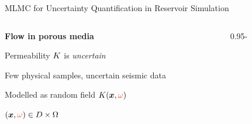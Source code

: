 \def\name{MLMC for Uncertainty Quantification in Reservoir Simulation}

\begin{frame}{\name{}}
    \setlength{\cw}{0.6\textwidth}%
    \begin{overlayarea}{\textwidth}{\frameheight}
        \vspace{2em}
        \begin{columns}
            \begin{column}{\cw}
                \textbf{Flow in porous media}
                \begin{squarelist}
                    \item<3-> Permeability $K$ is \emph{uncertain}
                    \begin{vertlist}
                        \item Few physical samples, uncertain seismic data
                    \end{vertlist}
                    \item<4-> Modelled as random field $K(\vx, \redtext{\omega})$
                    \begin{vertlist}
                        \item $(\vx, \redtext{\omega}) \in \spa \times \Omega$
                    \end{vertlist}
                \end{squarelist}
            \end{column}
            \begin{column}{0.95\textwidth - \cw}
\end{column}
\end{columns}
\end{overlayarea}
\end{frame}
